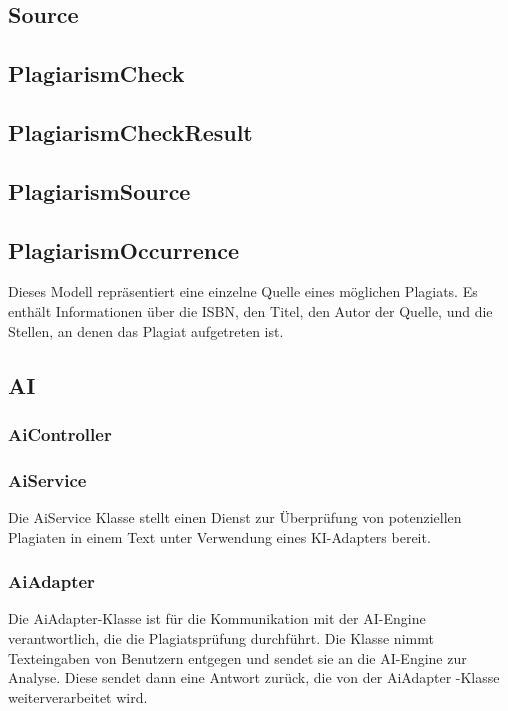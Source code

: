 \subsection{Source}\label{subsec:source}

\subsection{PlagiarismCheck}\label{subsec:plagiarism_check}

\subsection{PlagiarismCheckResult}\label{subsec:plagiarism_check_result}

\subsection{PlagiarismSource}\label{subsec:plagiarism_source}

\subsection{PlagiarismOccurrence}\label{subsec:plagiarism_occurrence}
Dieses Modell repräsentiert eine einzelne Quelle eines möglichen Plagiats.
Es enthält Informationen über die ISBN, den Titel,
den Autor der Quelle, und die Stellen, an denen das Plagiat aufgetreten ist.

\subsection{AI}\label{subsec:ai}

\subsubsection{AiController}\label{subsubsec:ai_controller}

\subsubsection{AiService}\label{subsubsec:ai_service}
Die AiService Klasse stellt einen Dienst zur Überprüfung von potenziellen Plagiaten in einem Text unter Verwendung eines KI-Adapters bereit.

\subsubsection{AiAdapter}\label{subsubsec:ai_adapter}
Die AiAdapter-Klasse ist für die Kommunikation mit der AI-Engine verantwortlich, die die Plagiatsprüfung durchführt.
Die Klasse nimmt Texteingaben von Benutzern entgegen und sendet sie an die AI-Engine zur Analyse.
Diese sendet dann eine Antwort zurück, die von der AiAdapter -Klasse weiterverarbeitet wird.

